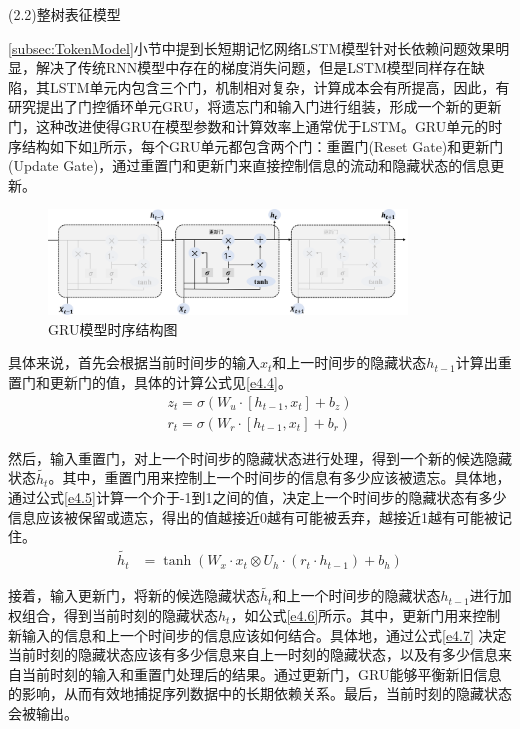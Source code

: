 (2.2)整树表征模型

\ref{subsec:TokenModel}小节中提到长短期记忆网络LSTM模型针对长依赖问题效果明显，解决了传统RNN模型中存在的梯度消失问题，但是LSTM模型同样存在缺陷，其LSTM单元内包含三个门，机制相对复杂，计算成本会有所提高，因此，有研究提出了门控循环单元GRU，将遗忘门和输入门进行组装，形成一个新的更新门，这种改进使得GRU在模型参数和计算效率上通常优于LSTM。GRU单元的时序结构如下如\ref{fig:GRU}所示，每个GRU单元都包含两个门：重置门(Reset Gate)和更新门(Update Gate)，通过重置门和更新门来直接控制信息的流动和隐藏状态的信息更新。

\begin{figure}[H]
  \centering
  \includegraphics[width=0.85\textwidth]{figures/GRU.png}
  \caption{GRU模型时序结构图}\label{fig:GRU}
\end{figure}

具体来说，首先会根据当前时间步的输入$x_{t}$和上一时间步的隐藏状态$h_{t-1}$计算出重置门和更新门的值，具体的计算公式见\ref{e4.4}。
\begin{equation}\label{e4.4}
  \begin{split}
    z_{t} = \sigma \left(W_{u} \cdot \left[h_{t-1},x_{t}\right] + b_z \right)
    \\
    r_{t} = \sigma \left(W_{r} \cdot \left[h_{t-1},x_{t}\right]  + b_r \right)
  \end{split}
\end{equation}

然后，输入重置门，对上一个时间步的隐藏状态进行处理，得到一个新的候选隐藏状态$\widetilde{h_t}$。其中，重置门用来控制上一个时间步的信息有多少应该被遗忘。具体地，通过公式\ref{e4.5}计算一个介于-1到1之间的值，决定上一个时间步的隐藏状态有多少信息应该被保留或遗忘，得出的值越接近0越有可能被丢弃，越接近1越有可能被记住。
\begin{equation}\label{e4.5}
  \begin{split}
    \widetilde{h_t} &= \tanh \left(W_x \cdot x_t \otimes U_h \cdot\left(r_t \cdot h_{t-1}\right) + b_h  \right)
  \end{split}
\end{equation}

接着，输入更新门，将新的候选隐藏状态$\widetilde{h_t}$和上一个时间步的隐藏状态$h_{t-1}$进行加权组合，得到当前时刻的隐藏状态$h_t$，如公式\ref{e4.6}所示。其中，更新门用来控制新输入的信息和上一个时间步的信息应该如何结合。具体地，通过公式\ref{e4.7} 决定当前时刻的隐藏状态应该有多少信息来自上一时刻的隐藏状态，以及有多少信息来自当前时刻的输入和重置门处理后的结果。通过更新门，GRU能够平衡新旧信息的影响，从而有效地捕捉序列数据中的长期依赖关系。最后，当前时刻的隐藏状态会被输出。

